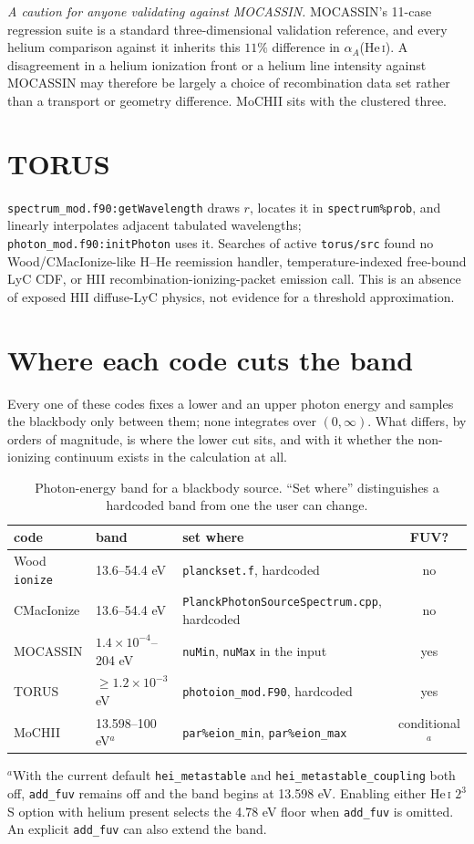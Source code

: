 \documentclass[11pt]{my_memo}
\begin{document}
\emph{A caution for anyone validating against MOCASSIN.}  MOCASSIN's 11-case regression suite is a standard three-dimensional validation reference, and every helium comparison against it inherits this $11\%$ difference in $\alpha_A$(He\,\textsc{i}).  A disagreement in a helium ionization front or a helium line intensity against MOCASSIN may therefore be largely a choice of recombination data set rather than a transport or geometry difference.  MoCHII sits with the clustered three.

\section{TORUS}
\texttt{spectrum\_mod.f90:getWavelength} draws $r$, locates it in \texttt{spectrum\%prob}, and linearly interpolates adjacent tabulated wavelengths; \texttt{photon\_mod.f90:initPhoton} uses it.  Searches of active \texttt{torus/src} found no Wood/CMacIonize-like H--He reemission handler, temperature-indexed free-bound LyC CDF, or HII recombination-ionizing-packet emission call.  This is an absence of exposed HII diffuse-LyC physics, not evidence for a threshold approximation.
\section{Where each code cuts the band}\label{sec:band}
Every one of these codes fixes a lower and an upper photon energy and samples the
blackbody only between them; none integrates over $(0,\infty)$.  What differs, by
orders of magnitude, is where the lower cut sits, and with it whether the
non-ionizing continuum exists in the calculation at all.

\begin{table}[t]
\centering
\caption{Photon-energy band for a blackbody source.  ``Set where'' distinguishes
a hardcoded band from one the user can change.\label{tab:band}}
\begin{tabular}{lllc}
\hline
code & band & set where & FUV?\\
\hline
Wood \texttt{ionize} & 13.6--54.4 eV & \texttt{planckset.f}, hardcoded & no\\
CMacIonize & 13.6--54.4 eV & \texttt{PlanckPhotonSourceSpectrum.cpp}, hardcoded & no\\
MOCASSIN & $1.4\times10^{-4}$--204 eV & \texttt{nuMin}, \texttt{nuMax} in the input & yes\\
TORUS & $\ge1.2\times10^{-3}$ eV & \texttt{photoion\_mod.F90}, hardcoded & yes\\
MoCHII & 13.598--100 eV${}^a$ & \texttt{par\%eion\_min}, \texttt{par\%eion\_max} & conditional${}^a$\\
\hline
\end{tabular}

\smallskip
\parbox{0.9\textwidth}{\footnotesize ${}^a$With the current default \texttt{hei\_metastable} and \texttt{hei\_metastable\_coupling} both off, \texttt{add\_fuv} remains off and the band begins at 13.598 eV. Enabling either He\,\textsc{i} $2^3$S option with helium present selects the 4.78 eV floor when \texttt{add\_fuv} is omitted. An explicit \texttt{add\_fuv} can also extend the band.}
\end{table}
\end{document}
